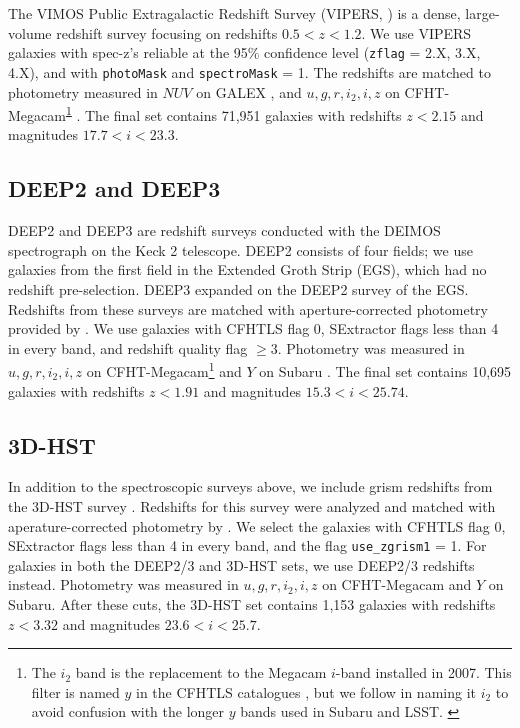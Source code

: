 \documentclass[twocolumn]{aastex63}
\begin{document}
    The VIMOS Public Extragalactic Redshift Survey (VIPERS, \citealt{Scodeggio2018a}) is a dense, large-volume redshift survey focusing on redshifts $0.5 < z < 1.2$.
    We use VIPERS galaxies with spec-z's reliable at the 95\% confidence level (\texttt{zflag} = 2.X, 3.X, 4.X), and with \texttt{photoMask} and \texttt{spectroMask} = 1.
    The redshifts are matched to photometry measured in $NUV$ on GALEX \citep{Martin2005a}, and $u,g,r,i_2,i,z$ on CFHT-Megacam\textsuperscript{\ref{ft:i2}} \citep{Hudelot2012}. 
    The final set contains 71,951 galaxies with redshifts $z < 2.15$ and magnitudes $17.7 < i < 23.3$. 

    \subsection{DEEP2 and DEEP3}

    DEEP2 and DEEP3 are redshift surveys conducted with the DEIMOS spectrograph on the Keck 2 telescope.
    DEEP2 \citep{Newman2013b} consists of four fields; we use galaxies from the first field in the Extended Groth Strip (EGS), which had no redshift pre-selection.
    DEEP3 \citep{Cooper2011} expanded on the DEEP2 survey of the EGS.
    Redshifts from these surveys are matched with aperture-corrected photometry provided by \citet{Zhou2019a}.
    We use galaxies with CFHTLS flag 0, SExtractor flags less than 4 in every band, and redshift quality flag $\geq 3$.
    Photometry was measured in $u,g,r,i_2,i,z$ on CFHT-Megacam\footnote{The $i_2$ band is the replacement to the Megacam $i$-band installed in 2007. This filter is named $y$ in the CFHTLS catalogues \citep{Hudelot2012}, but we follow \citet{Zhou2019a} in naming it $i_2$ to avoid confusion with the longer $y$ bands used in Subaru and LSST. \label{ft:i2}} and $Y$ on Subaru \citep{Miyazaki2002}.
    The final set contains 10,695 galaxies with redshifts $z < 1.91$ and magnitudes $15.3 < i < 25.74$.


    \subsection{3D-HST}

    In addition to the spectroscopic surveys above, we include grism redshifts from the 3D-HST survey \citep{Newman2013b,Momcheva2016b}.
    Redshifts for this survey were analyzed and matched with aperature-corrected photometry by \citet{Zhou2019a}.
    We select the galaxies with CFHTLS flag 0, SExtractor flags less than 4 in every band, and the flag \texttt{use\_zgrism1} = 1.
    For galaxies in both the DEEP2/3 and 3D-HST sets, we use DEEP2/3 redshifts instead.
    Photometry was measured in $u,g,r,i_2,i,z$ on CFHT-Megacam and $Y$ on Subaru.
    After these cuts, the 3D-HST set contains 1,153 galaxies with redshifts $z < 3.32$ and magnitudes $23.6 < i < 25.7$.
\end{document}
